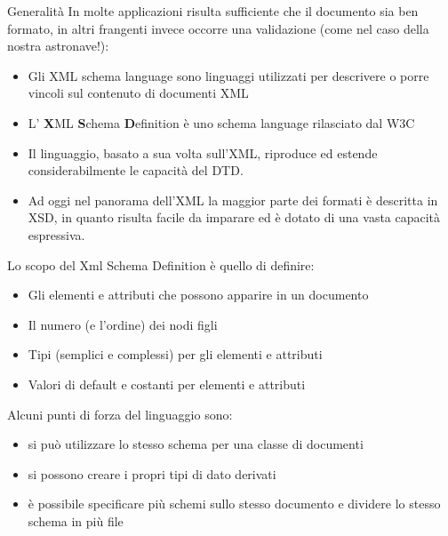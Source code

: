 \documentclass{beamer}
\begin{document}
    \begin{frame}{Generalità}
    In molte applicazioni risulta sufficiente che il documento sia ben formato, in altri frangenti invece occorre una validazione (come nel caso della nostra astronave!):
    \begin{itemize}
     \item Gli XML schema language sono linguaggi utilizzati per descrivere o porre vincoli sul contenuto di documenti XML
     \item L' \textbf{X}ML \textbf{S}chema \textbf{D}efinition è uno schema language rilasciato dal W3C
     \item Il linguaggio, basato a sua volta sull'XML, riproduce ed estende considerabilmente le capacità del DTD.
     \item Ad oggi nel panorama dell'XML la maggior parte dei formati è descritta in XSD, in quanto risulta facile da imparare ed è dotato di una vasta capacità espressiva.
    \end{itemize}
    \end{frame}
    
    \begin{frame}
    Lo scopo del Xml Schema Definition è quello di definire:
    \begin{itemize}
    \item Gli elementi e attributi che possono apparire in un documento
    \item Il numero (e l'ordine) dei nodi figli
    \item Tipi (semplici e complessi) per gli elementi e attributi
    \item Valori di default e costanti per elementi e attributi
    \end{itemize}\bigskip
    Alcuni punti di forza del linguaggio sono:
    \begin{itemize}
    \item si può utilizzare lo stesso schema per una classe di documenti
    \item si possono creare i propri tipi di dato derivati
    \item è possibile specificare più schemi sullo stesso documento e dividere lo stesso schema in più file  
    \end{itemize}
    \end{frame}
    
\end{document}
